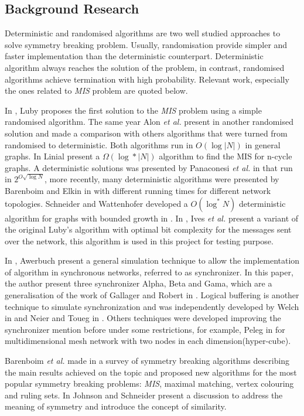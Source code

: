 \subsection{Background Research}
 
Deterministic and randomised algorithms are two well studied approaches to solve symmetry breaking problem. Usually, randomisation provide simpler and faster implementation than the deterministic counterpart. Deterministic algorithm always reaches the solution of the problem, in contrast, randomised algorithms achieve termination with high probability. Relevant work, especially the ones related to \textit{MIS} problem are quoted below.

In \cite{luby1986simple}, Luby proposes the first solution to the \textit{MIS} problem using a simple randomised algorithm. The same year Alon \textit{et al.} present in \cite{alon1986fast} another randomised solution and made a comparison with others algorithms that were turned from randomised to deterministic. Both algorithms run in $O(\log |N|)$ in general graphs. In \cite{linial1992locality} Linial present a $\Omega(\log* |N|)$ algorithm to find the MIS for n-cycle graphs. A deterministic solutions was presented by Panaconesi \textit{et al.} in \cite{panconesi1996complexity} that run in $2^{O\sqrt{\log N}}$, more recently, many deterministic algorithms were presented by Barenboim and Elkin in \cite{barenboim2010sublogarithmic} with different running times for different network topologies. Schneider and Wattenhofer developed a $O(\log^* N)$ deterministic algorithm for graphs with bounded growth in \cite{barenboim2010sublogarithmic}. In \cite{yves2009optimal}, Ives \textit{et al.} present a variant of the original Luby's algorithm with optimal bit complexity for the messages sent over the network, this algorithm is used in this project for testing purpose.

 

In \cite{awerbuch1985complexity}, Awerbuch present a general simulation technique to allow the implementation of algorithm in synchronous networks, referred to as synchronizer. In this paper, the author present three synchronizer Alpha, Beta and Gama, which are a generalisation of the work of Gallager and Robert in \cite{gallager1982distributed}. Logical buffering is another technique to simulate synchronization and was independently developed by Welch in \cite{welch1987simulating} and Neier and Toueg in \cite{neiger1993simulating}. Others techniques were developed improving the synchronizer mention before under some restrictions, for example, Peleg in \cite{peleg1989optimal} for multidimensional mesh network with two nodes in each dimension(hyper-cube).

 Barenboim \textit{et al.} made in \cite{barenboim2016locality} a survey of symmetry breaking algorithms describing the main results achieved on the topic and proposed new algorithms for the most popular symmetry breaking problems: \textit{MIS}, maximal matching, vertex colouring and ruling sets. In \cite{johnson1985symmetry} Johnson and Schneider present a discussion to address the meaning of symmetry and introduce the concept of similarity.  
\newline